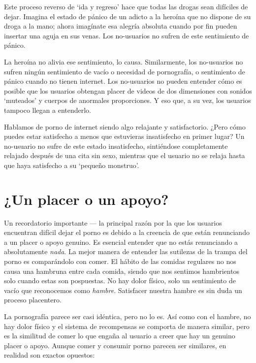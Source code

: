 \documentclass[
  spanish,
  openany]{book}
\begin{document}
Este proceso reverso de `ida y regreso' hace que todas las drogas sean difíciles de dejar. Imagina el estado de pánico de un adicto a la heroína que no dispone de su droga a la mano; ahora imagínate esa alegría absoluta cuando por fin pueden insertar una aguja en sus venas. Los no-usuarios no sufren de este sentimiento de pánico.

La heroína no alivia ese sentimiento, lo causa. Similarmente, los no-usuarios no sufren ningún sentimiento de vacío o necesidad de pornografía, o sentimiento de pánico cuando no tienen internet. Los no-usuarios no pueden entender cómo es posible que los usuarios obtengan placer de videos de dos dimensiones con sonidos `muteados' y cuerpos de anormales proporciones. Y eso que, a su vez, los usuarios tampoco llegan a entenderlo.

Hablamos de porno de internet siendo algo relajante y satisfactorio. ¿Pero cómo puedes estar satisfecho a menos que estuvieras insatisfecho en primer lugar? Un no-usuario no sufre de este estado insatisfecho, sintiéndose completamente relajado después de una cita sin sexo, mientras que el usuario no se relaja hasta que haya satisfecho a su `pequeño monstruo'.

\hypertarget{un-placer-o-un-apoyo}{%
\section{¿Un placer o un apoyo?}\label{un-placer-o-un-apoyo}}

Un recordatorio importante --- la principal razón por la que los usuarios encuentran difícil dejar el porno es debido a la creencia de que están renunciando a un placer o apoyo genuino. Es esencial entender que no estás renunciando a absolutamente \emph{nada}. La mejor manera de entender las sutilezas de la trampa del porno es comparándolo con comer. El hábito de las comidas regulares no nos causa una hambruna entre cada comida, siendo que nos sentimos hambrientos solo cuando estas son pospuestas. No hay dolor físico, solo un sentimiento de vacío que reconocemos como \emph{hambre}. Satisfacer nuestra hambre es sin duda un proceso placentero.

La pornografía parece ser casi idéntica, pero no lo es. Así como con el hambre, no hay dolor físico y el sistema de recompensas se comporta de manera similar, pero es la similitud de comer lo que engaña al usuario a creer que hay un genuino placer o apoyo. Aunque comer y consumir porno parecen ser similares, en realidad son exactos opuestos:
\end{document}
